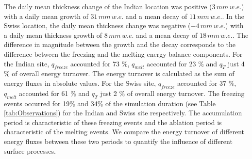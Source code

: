 \documentclass[utf8]{frontiersSCNS}
\begin{document}
The daily mean thickness change of the Indian location was positive ($3\, mm \,w.e.$) with a daily mean growth
of $31\, mm \,w.e.$ and a mean decay of $11\, mm \,w.e.$. In the Swiss location, the daily mean
thickness change was negative ($-4\, mm \,w.e.$) with a daily mean thickness growth of $8\, mm \,w.e.$ and a
mean decay of $18\, mm \,w.e.$. The difference in magnitude between the growth and the decay corresponds to the
difference between the freezing and the melting energy balance components. For the Indian site, $q_{freeze}$
accounted for 73 \%, $q_{melt}$ accounted for 23 \% and $q_{T}$ just 4 \% of overall energy turnover. The energy
turnover is calculated as the sum of energy fluxes in absolute values. For the Swiss site, $q_{freeze}$
accounted for 37 \%, $q_{melt}$ accounted for 61 \%  and $q_{T}$ just 2 \% of overall energy turnover. The
freezing events occurred for 19\% and 34\% of the simulation duration (see Table \ref{tab:Observations}) for the
Indian and Swiss site respectively. The accumulation period is characteristic of these freezing events and the
ablation period is characteristic of the melting events. We compare the energy turnover of different energy
fluxes between these two periods to quantify the influence of different surface processes.
\end{document}
